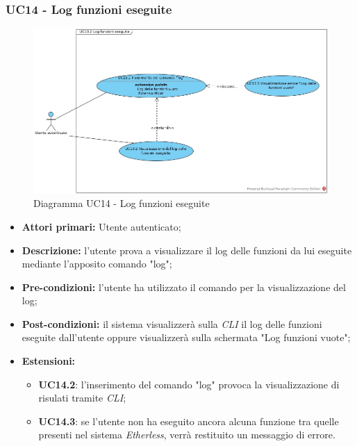 \subsubsection{UC14 - Log funzioni eseguite}
\begin{figure}[h]
	\centering
	\includegraphics[width=\linewidth]{res/img/UC13.jpg}
	\caption{Diagramma UC14 - Log funzioni eseguite}
\end{figure}
\begin{itemize}
	\item \textbf{Attori primari:} Utente autenticato;
	\item \textbf{Descrizione:} l'utente prova a visualizzare il log delle funzioni da lui eseguite mediante l'apposito comando "log";
	\item \textbf{Pre-condizioni:} l'utente ha utilizzato il comando per la visualizzazione del log;
	\item \textbf{Post-condizioni:} il sistema visualizzerà sulla \textit{CLI\glo} il log delle funzioni eseguite dall'utente oppure visualizzerà sulla schermata "Log funzioni vuote";
	\item \textbf{Estensioni:}
	\begin{itemize}
		\item \textbf{UC14.2}: l'inserimento del comando "log" provoca la visualizzazione di risulati tramite \textit{CLI\glos};
		\item \textbf{UC14.3}: se l'utente non ha eseguito ancora alcuna funzione tra quelle presenti nel sistema \textit{Etherless\glos}, verrà restituito un messaggio di errore.
	\end{itemize}
\end{itemize}
